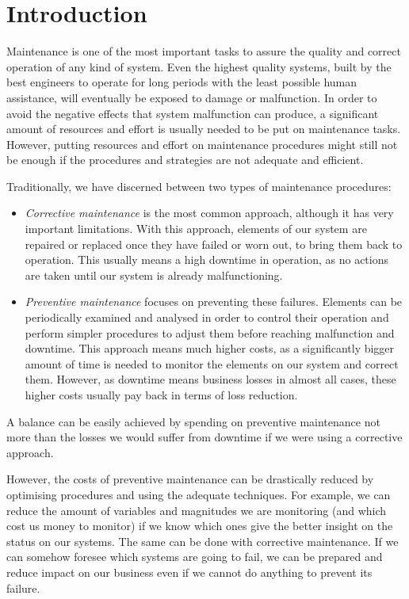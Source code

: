 \section{Introduction}
\label{sec:context}
Maintenance is one of the most important tasks to assure the quality and correct operation of any kind of system. Even the highest quality systems, built by the best engineers to operate for long periods with the least possible human assistance, will eventually be exposed to damage or malfunction. In order to avoid the negative effects that system malfunction can produce, a significant amount of resources and effort is usually needed to be put on maintenance tasks. However, putting resources and effort on maintenance procedures might still not be enough if the procedures and strategies are not adequate and efficient.

Traditionally, we have discerned between two types of maintenance procedures:
\begin{itemize}
\item \emph{Corrective maintenance} is the most common approach, although it has very important limitations. With this approach, elements of our system are repaired or replaced once they have failed or worn out, to bring them back to operation. This usually means a high downtime in operation, as no actions are taken until our system is already malfunctioning.

\item \emph{Preventive maintenance} focuses on preventing these failures. Elements can be periodically examined and analysed in order to control their operation and perform simpler procedures to adjust them before reaching malfunction and downtime. This approach means much higher costs, as a significantly bigger amount of time is needed to monitor the elements on our system and correct them. However, as downtime means business losses in almost all cases, these higher costs usually pay back in terms of loss reduction.
\end{itemize}

A balance can be easily achieved by spending on preventive maintenance not more than the losses we would suffer from downtime if we were using a corrective approach.

However, the costs of preventive maintenance can be drastically reduced by optimising procedures and using the adequate techniques. For example, we can reduce the amount of variables and magnitudes we are monitoring (and which cost us money to monitor) if we know which ones give the better insight on the status on our systems. The same can be done with corrective maintenance. If we can somehow foresee which systems are going to fail, we can be prepared and reduce impact on our business even if we cannot do anything to prevent its failure.


